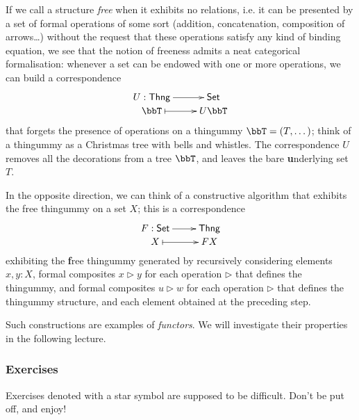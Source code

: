 \documentclass[11pt]{article}
\begin{document}
If we call a structure \emph{free} when it exhibits no relations, i.e. it can be presented by a set of formal operations of some sort (addition, concatenation, composition of arrows\dots) without the request that these operations satisfy any kind of binding equation, we see that the notion of freeness admits a neat categorical formalisation: whenever a set can be endowed with one or more operations, we can build a correspondence
\[\xymatrix@R=0cm{ U : {\sf Thng} \ar[r] & {\sf Set} \\
  \bbT \ar@{|->}[r] & U\bbT}\]
that forgets the presence of operations on a thingummy $\bbT = (T,\dots)$; think of a thingummy as a Christmas tree with bells and whistles. The correspondence $U$ removes all the decorations from a tree $\bbT$, and leaves the bare \textbf{u}nderlying set $T$.

In the opposite direction, we can think of a constructive algorithm that exhibits the free thingummy on a set $X$; this is a correspondence
\[\xymatrix@R=0cm{ F : {\sf Set} \ar[r] & {\sf Thng} \\
X \ar@{|->}[r] & FX}\]
exhibiting the \textbf{f}ree thingummy generated by recursively considering elements $x,y : X$, formal composites $x \rhd y$ for each operation $\rhd$ that defines the thingummy, and formal composites $u \rhd w$ for each operation $\rhd$ that defines the thingummy structure, and each element obtained at the preceding step.

Such constructions are examples of \emph{functors}. We will investigate their properties in the following lecture.
\subsubsection{Exercises}
Exercises denoted with a star symbol are supposed to be difficult. Don't be put off, and enjoy!
\end{document}
